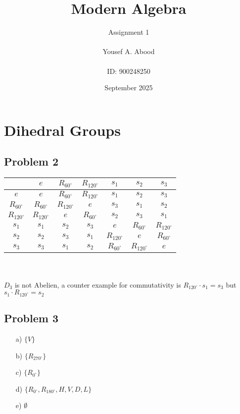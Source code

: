 \documentclass[a4paper,12pt]{article}
\title{Modern Algebra}
\author{Assignment 1\\ \\ Yousef A. Abood\\ \\ ID: 900248250}
\date{September 2025}
\begin{document}
\maketitle
\noindent\makebox[\linewidth]{\rule{15cm}{0.4pt}}
\section{Dihedral Groups}
\subsection*{Problem 2}
\begin{tabular}{|c|c|c|c|c|c|c|}
    \hline
    &$e$&$R_{60^\circ}$&$R_{120^\circ}$&$s_1$&$s_2$&$s_3$\\ \hline
    $e$&$e$&$R_{60^\circ}$&$R_{120^\circ}$&$s_1$&$s_2$&$s_3$\\ \hline
    $R_{60^\circ}$&$R_{60^\circ}$&$R_{120^\circ}$&$e$&$s_3$&$s_1$&$s_2$\\ \hline
    $R_{120^\circ}$&$R_{120^\circ}$&$e$&$R_{60^\circ}$&$s_2$&$s_3$&$s_1$\\ \hline
    $s_1$&$s_1$&$s_2$&$s_3$&$e$&$R_{60^\circ}$&$R_{120^\circ}$\\ \hline
    $s_2$&$s_2$&$s_3$&$s_1$&$R_{120^\circ}$&$e$&$R_{60^\circ}$\\ \hline
    $s_3$&$s_3$&$s_1$&$s_2$&$R_{60^\circ}$&$R_{120^\circ}$&$e$ \\ \hline
\end{tabular}\\ \\
$D_3$ is not Abelien, a counter example for commutativity is $R_{120^\circ} \cdot s_1=s_3$ but $ s_1\cdot R_{120^\circ}=s_2$
\subsection*{Problem 3}
\begin{itemize}
    \item [a)] $\{V\}$
    \item [b)] $\{R_{270^\circ}\}$
    \item [c)] $\{R_{0^\circ}\}$
    \item [d)] $\{R_{0^\circ},R_{180^\circ}, H,V,D,L\}$
    \item [e)] $\emptyset$
\end{itemize}
\end{document}
